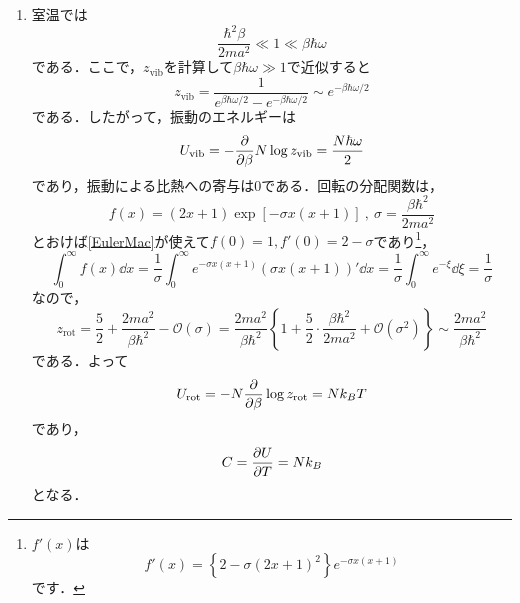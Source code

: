 \documentclass[a4paper,pdflatex,ja=standard]{bxjsarticle}
\begin{document}
\begin{enumerate}
  \item 
  室温では
  \begin{equation}
    \frac{\hbar^2 \beta}{2ma^2}
    \ll
    1
    \ll
    \beta\hbar\omega
  \end{equation}  
  である．ここで，$z_{\text{vib}}$を計算して$\beta\hbar\omega\gg 1$で近似すると
  \begin{equation}
    z_{\text{vib}}
    =
    \frac{1}{e^{\beta\hbar\omega/2}-e^{-\beta\hbar\omega/2}}
    \sim
    e^{-\beta\hbar\omega/2}
  \end{equation}
  である．したがって，振動のエネルギーは
  \begin{equation}
    U_{\text{vib}}
    =
    -\pdv{}{\beta}N\log z_{\text{vib}}
    =
    \frac{N\hbar\omega}{2}
  \end{equation}
  であり，振動による比熱への寄与は$0$である．回転の分配関数は，
  \begin{equation}
    f(x)
    =
    (2x+1)\exp\left[ -\sigma x(x+1) \right]
    \ ,\ 
    \sigma
    =
    \frac{\beta\hbar^2}{2ma^2}
  \end{equation}
  とおけば\eqref{EulerMac}が使えて$f(0)=1,f'(0)=2-\sigma$であり\footnote{
    $f'(x)$は
    \begin{equation}
      f'(x)
      =
      \left\{  
        2-\sigma(2x+1)^{2}
      \right\}
      e^{-\sigma x(x+1)}
    \end{equation}
    です．
  }，
  \begin{equation}
    \int_{0}^{\infty}f(x)\dd x
    =
    \frac{1}{\sigma}\int_{0}^{\infty}e^{-\sigma x(x+1)}(\sigma x(x+1))' \dd x
    =
    \frac{1}{\sigma}\int_{0}^{\infty} e^{-\xi} \dd \xi
    =
    \frac{1}{\sigma}
  \end{equation}
  なので，
  \begin{equation}
    z_{\text{rot}}
    =
    \frac{5}{2}
    +
    \frac{2ma^2}{\beta\hbar^2}
    -
    \mathcal{O}(\sigma)
    =
    \frac{2ma^2}{\beta\hbar^2}
    \left\{  
      1+\frac{5}{2}\cdot\frac{\beta\hbar^2}{2ma^2}
      +
      \mathcal{O}(\sigma^2)
    \right\}
    \sim
    \frac{2ma^2}{\beta\hbar^2}
    \label{part_rot}
  \end{equation}
  である．よって
  \begin{equation}
    U_{\text{rot}}
    =
    -N\pdv{}{\beta}\log z_{\text{rot}}
    =
    Nk_{B}T
  \end{equation}
  であり，
  \begin{equation}
    C
    =
    \pdv{U}{T}
    =
    Nk_{B}
  \end{equation}
  となる．

\end{enumerate}
\end{document}
